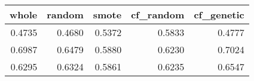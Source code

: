 \begin{tabular}{rrrrr}
\toprule

 whole &  random &  smote &  cf\_random &  cf\_genetic \\
\midrule

0.4735 &  0.4680 & 0.5372 &     0.5833 &      0.4777 \\
0.6987 &  0.6479 & 0.5880 &     0.6230 &      0.7024 \\
0.6295 &  0.6324 & 0.5861 &     0.6235 &      0.6547 \\

\bottomrule
\end{tabular}
